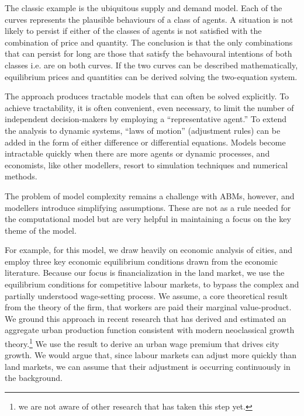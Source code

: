 The classic example is the ubiquitous supply and demand model. Each of the curves represents the plausible behaviours of a class of agents. A situation is not likely to persist if either of the classes of agents is not satisfied with the combination of price and quantity. The conclusion is that the only combinations that can persist for long are  those that satisfy the behavoural intentions of both classes i.e. are on both curves. If the two curves can be described mathematically, equilibrium prices and quantities can be derived solving the two-equation system.

The approach produces tractable models that can often be solved explicitly. To achieve tractability, it is often convenient, even necessary, to limit the number of independent decision-makers by employing a ``representative agent.'' To extend the analysis to dynamic systems, ``laws of motion'' (adjustment rules) can be added in the form of either difference or differential equations.  Models become intractable quickly when there are more agents or dynamic processes, and economists, like other modellers,  %
resort to simulation techniques  and numerical methods. 

The problem of model complexity remains a challenge with ABMs, however, and modellers introduce simplifying assumptions. These are not as a rule needed for the computational model but are very helpful in maintaining a focus on the key theme  of the model. 

For example, for this model, we draw heavily on economic analysis of cities, and employ three key economic equilibrium conditions drawn from the economic literature. 
Because our focus is financialization in the land market, we use the equilibrium conditions for competitive labour markets, to bypass the complex and partially understood wage-setting process. We assume, a core theoretical result from the theory of the firm, that workers are paid their marginal value-product. We ground this approach in recent research that has %
derived and estimated an aggregate urban production function consistent with modern neoclassical growth theory.\footnote{we are not aware of other research that has taken this step yet.} We use the result to derive an urban wage premium that drives city growth. We would argue that, since labour markets can adjust more quickly than land markets, we can assume that their adjustment is occurring continuously in the background.  

